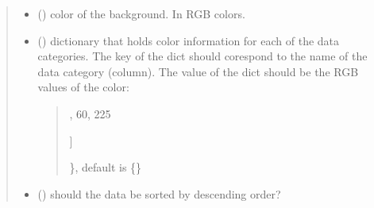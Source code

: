 \documentclass[letterpaper,10pt,english]{sphinxmanual}
\begin{document}
\begin{fulllineitems}
\begin{quote}
\begin{description}
\begin{itemize}
\item {} 
\sphinxAtStartPar
{} (\sphinxstyleliteralemphasis{\sphinxupquote{ (}}\sphinxstyleliteralemphasis{\sphinxupquote{, }}\sphinxstyleliteralemphasis{\sphinxupquote{, }}\sphinxstyleliteralemphasis{\sphinxupquote{)}}) \textendash{} color of the background. In RGB colors.

\item {} 
\sphinxAtStartPar
{} () \textendash{} 
\sphinxAtStartPar
dictionary that holds color information for each of the data categories. The key of the dict should
corespond to the name of the data category (column). The value of the dict should be the RGB values of the color:
\begin{quote}
\begin{description}
\sphinxlineitem{\{}\begin{description}
\sphinxlineitem{“United States”: {[}}
,
60,
225

\end{description}

\sphinxAtStartPar
{]}

\end{description}

\sphinxAtStartPar
\}, default is \{\}
\end{quote}


\item {} 
\sphinxAtStartPar
{} () \textendash{} should the data be sorted by descending order?

\end{itemize}

\end{description}\end{quote}

\end{fulllineitems}

\end{document}
